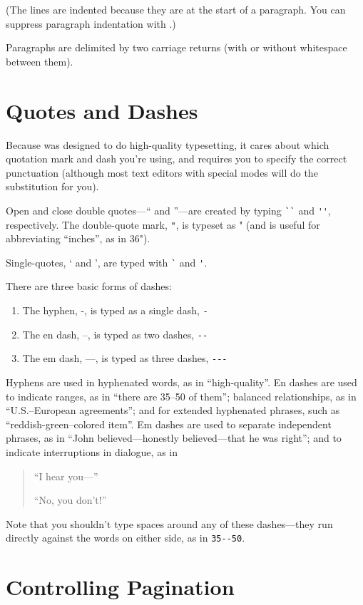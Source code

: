 (The lines are indented because they are at the start of a paragraph.
You can suppress paragraph indentation with .)

Paragraphs are delimited by two carriage returns (with or without
whitespace between them).


\section{Quotes and Dashes}

Because \tex was designed to do high-quality typesetting, it cares
about which quotation mark and dash you're using, and requires you to
specify the correct punctuation (although most text editors with
special \tex modes will do the substitution for you).

Open and close double quotes---`` and ''---are created by typing
\verb+``+ and \verb+''+, respectively.  The double-quote mark,
\verb+"+, is typeset as " (and is useful for abbreviating ``inches'',
as in 36").

Single-quotes, ` and ', are typed with \verb+`+ and \verb+'+.

There are three basic forms of dashes:
\begin{enumerate}
\item The hyphen, -, is typed as a single dash, \verb+-+
\item The en dash, --, is typed as two dashes, \verb+--+
\item The em dash, ---, is typed as three dashes, \verb+---+
\end{enumerate}

Hyphens are used in hyphenated words, as in ``high-quality''.  En
dashes are used to indicate ranges, as in ``there are 35--50 of
them''; balanced relationships, as in ``U.S.--European agreements'';
and for extended hyphenated phrases, such as ``reddish-green--colored
item''.   Em dashes are used to separate independent phrases, as in
``John believed---honestly believed---that he was right''; and to
indicate interruptions in dialogue, as in
\begin{quotation}
  ``I hear you---''

  ``No, you don't!''
\end{quotation}

Note that you shouldn't type spaces around any of these dashes---they
run directly against the words on either side, as in \verb+35--50+.


\section{Controlling Pagination}%
\label{sec:pagination}

